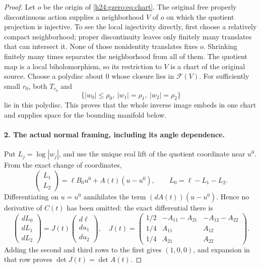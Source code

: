 \begin{proof}
Let \(o\) be the origin of \eqref{h24:gzero:eq:chart}. The original free properly
discontinuous action supplies a neighborhood \(V\) of \(o\) on which
the quotient projection is injective. To see the local injectivity
directly, first choose a relatively compact neighborhood; proper
discontinuity leaves only finitely many translates that can intersect it.
None of those nonidentity translates fixes \(o\). Shrinking finitely
many times separates the neighborhood from all of them. The quotient
map is a local biholomorphism, so its restriction to \(V\) is a chart
of the original source.
Choose a polydisc about \(0\) whose closure lies in \(\mathcal F(V)\).
For sufficiently small \(r_0\), both \(T_{r_0}\) and
\begin{equation}
 \{|w_0|\leq\rho_0,\ |w_1|=\rho_1,\ |w_2|=\rho_2\}
 \label{h24:gzero:eq:spatial-bound}
\end{equation}
lie in this polydisc. This proves that the whole inverse image embeds
in one chart and supplies space for the bounding manifold below.

\paragraph{2. The actual normal framing, including its angle dependence.}
Put \(L_j=\log|w_j|\), and use the unique real lift of the quotient
coordinate near \(u^0\). From the exact change of coordinates,
\begin{equation}
 \begin{pmatrix}L_1\\L_2\end{pmatrix}
 =\ell B_0u^0+A(t)(u-u^0),\qquad
 L_0=\ell-L_1-L_2.
 \label{h24:gzero:eq:nearby-moduli}
\end{equation}
Differentiating on \(u=u^0\) annihilates the term
\((dA(t))(u-u^0)\). Hence no derivative of \(C(t)\) has been omitted:
the exact differential there is
\begin{equation}
 \begin{pmatrix}dL_0\\dL_1\\dL_2\end{pmatrix}
 =J(t)\begin{pmatrix}d\ell\\du_1\\du_2\end{pmatrix},\quad
 J(t)=
 \begin{pmatrix}
 1/2&-A_{11}-A_{21}&-A_{12}-A_{22}\\
 1/4&A_{11}&A_{12}\\
 1/4&A_{21}&A_{22}
 \end{pmatrix}.
 \label{h24:gzero:eq:J}
\end{equation}
Adding the second and third rows to the first gives \((1,0,0)\),
and expansion in that row proves \(\det J(t)=\det A(t)\).


\end{proof}
